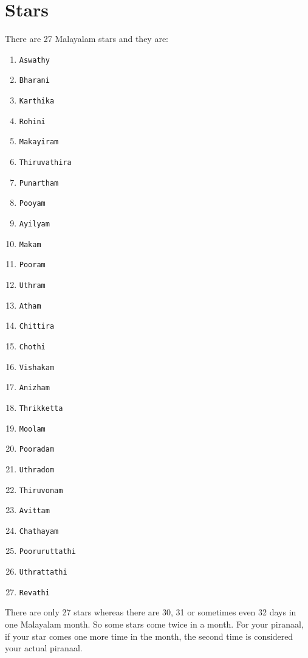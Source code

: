 \documentclass[10pt,twoside]{article}
\begin{document}
\section{Stars}
There are 27 Malayalam stars and they are:
\begin{enumerate}
\item \verb|Aswathy|
\item \verb|Bharani|
\item \verb|Karthika|
\item \verb|Rohini|
\item \verb|Makayiram|
\item \verb|Thiruvathira|
\item \verb|Punartham|
\item \verb|Pooyam|
\item \verb|Ayilyam|
\item \verb|Makam|
\item \verb|Pooram|
\item \verb|Uthram|
\item \verb|Atham|
\item \verb|Chittira|
\item \verb|Chothi|
\item \verb|Vishakam|
\item \verb|Anizham|
\item \verb|Thrikketta|
\item \verb|Moolam|
\item \verb|Pooradam|
\item \verb|Uthradom|
\item \verb|Thiruvonam|
\item \verb|Avittam|
\item \verb|Chathayam|
\item \verb|Pooruruttathi|
\item \verb|Uthrattathi|
\item \verb|Revathi|
\end{enumerate}

There are only 27 stars whereas there are 30, 31 or sometimes even 32 days in one Malayalam month. So some stars come twice in a month. For your piranaal, if your star comes one more time in the month, the second time is considered your actual piranaal.
\end{document}
